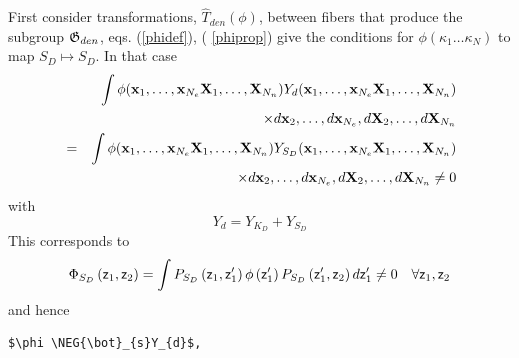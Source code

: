 First consider transformations, $\hat{T}_{den}\left( \phi \right) $, between
fibers that produce the subgroup ${\frak G}_{den}$, eqs. (\ref{phidef}), (%
\ref{phiprop}) give the conditions for $\phi (\kappa _{1}\ldots \kappa _{N})$
to map $S_{D}\mapsto S_{D}$. In that case 
\begin{eqnarray}
&&\int \phi ({\bf x}_{1},\ldots ,{\bf x}_{N_{e}}{\bf X}_{1},\ldots ,{\bf X}%
_{N_{n}})Y_{d}({\bf x}_{1},\ldots ,{\bf x}_{N_{e}}{\bf X}_{1},\ldots ,{\bf X}%
_{N_{n}})  \nonumber \\
&&\qquad \qquad \qquad \qquad \times d{\bf x}_{2},\ldots ,d{\bf x}_{N_{e}},d%
{\bf X}_{2},\ldots ,d{\bf X}_{N_{n}}  \nonumber \\
&=&\int \phi ({\bf x}_{1},\ldots ,{\bf x}_{N_{e}}{\bf X}_{1},\ldots ,{\bf X}%
_{N_{n}})Y_{S_{D}}({\bf x}_{1},\ldots ,{\bf x}_{N_{e}}{\bf X}_{1},\ldots ,%
{\bf X}_{N_{n}})  \nonumber \\
&&\qquad \qquad \qquad \qquad \times d{\bf x}_{2},\ldots ,d{\bf x}_{N_{e}},d%
{\bf X}_{2},\ldots ,d{\bf X}_{N_{n}}\neq 0
\end{eqnarray}%
with%
\begin{equation}
Y_{d}=Y_{K_{D}}+Y_{S_{D}}  \label{YKdYSd}
\end{equation}%
This corresponds to 
\begin{equation}
\Phi _{S_{D}}\left( {\sf z}_{1},{\sf z}_{2}\right) =\int P_{S_{D}}\left( 
{\sf z}_{1},{\sf z}_{1}^{\prime }\right) \phi \left( {\sf z}_{1}^{\prime
}\right) P_{S_{D}}\left( {\sf z}_{1}^{\prime },{\sf z}_{2}\right) d{\sf z}%
_{1}^{\prime }\neq 0\quad \forall {\sf z}_{1},{\sf z}_{2}  \label{projS}
\end{equation}%
and hence
\begin{verbatim}
$\phi \NEG{\bot}_{s}Y_{d}$, 
\end{verbatim}

